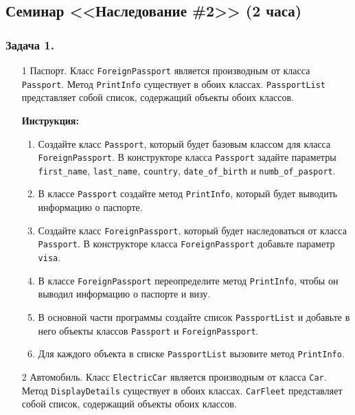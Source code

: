 \subsection{Семинар <<Наследование \#2>> (2 часа)}


\subsubsection{Задача 1.}
\begin{enumerate}
\item[1]
Паспорт. Класс \texttt{ForeignPassport} является производным от класса \texttt{Passport}. Метод \texttt{PrintInfo} существует в обоих классах. \texttt{PassportList} представляет собой список, содержащий объекты обоих классов.

\textbf{Инструкция:}
\begin{enumerate}
    \item Создайте класс \texttt{Passport}, который будет базовым классом для класса \texttt{ForeignPassport}. В конструкторе класса \texttt{Passport} задайте параметры \texttt{first\_name}, \texttt{last\_name}, \texttt{country}, \texttt{date\_of\_birth} и \texttt{numb\_of\_pasport}.
    \item В классе \texttt{Passport} создайте метод \texttt{PrintInfo}, который будет выводить информацию о паспорте.
    \item Создайте класс \texttt{ForeignPassport}, который будет наследоваться от класса \texttt{Passport}. В конструкторе класса \texttt{ForeignPassport} добавьте параметр \texttt{visa}.
    \item В классе \texttt{ForeignPassport} переопределите метод \texttt{PrintInfo}, чтобы он выводил информацию о паспорте и визу.
    \item В основной части программы создайте список \texttt{PassportList} и добавьте в него объекты классов \texttt{Passport} и \texttt{ForeignPassport}.
    \item Для каждого объекта в списке \texttt{PassportList} вызовите метод \texttt{PrintInfo}.
\end{enumerate}

\item[2]
Автомобиль. Класс \texttt{ElectricCar} является производным от класса \texttt{Car}. Метод \texttt{DisplayDetails} существует в обоих классах. \texttt{CarFleet} представляет собой список, содержащий объекты обоих классов.


\end{enumerate}
